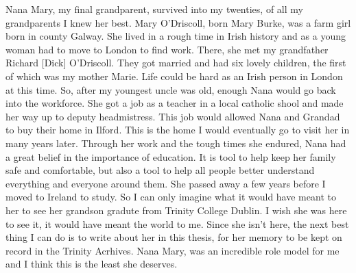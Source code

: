 Nana Mary, my final grandparent, survived into my twenties, of all my grandparents I knew her best. Mary O'Driscoll, born Mary Burke, was a farm girl born in county Galway. She lived in a rough time in Irish history and as a young woman had to move to London to find work. There, she met my grandfather Richard [Dick] O'Driscoll. They got married and had six lovely children, the first of which was my mother Marie. Life could be hard as an Irish person in London at this time. So, after my youngest uncle was old, enough Nana would go back into the workforce. She got a job as a teacher in a local catholic shool and made her way up to deputy headmistress. This job would allowed Nana and Grandad to buy their home in Ilford. This is the home I would eventually go to visit her in many years later. Through her work and the tough times she endured, Nana had a great belief in the importance of education. It is tool to help keep her family safe and comfortable, but also a tool to help all people better understand everything and everyone around them. She passed away a few years before I moved to Ireland to study. So I can only imagine what it would have meant to her to see her grandson gradute from Trinity College Dublin. I wish she was here to see it, it would have meant the world to me. Since she isn't here, the next best thing I can do is to write about her in this thesis, for her memory to be kept on record in the Trinity Acrhives. Nana Mary, was an incredible role model for me and I think this is the least she deserves.


